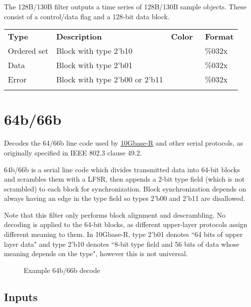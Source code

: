 The 128B/130B filter outputs a time series of 128B/130B sample objects. These consist of a control/data flag and
a 128-bit data block.

\begin{tabularx}{16cm}{lllX}
\thickhline
\textbf{Type} & \textbf{Description} & \textbf{Color} & \textbf{Format} \\
\thickhline
Ordered set & Block with type 2'b10 & \cellcolor{control}\textcolor{white}{Control} & \%032x \\
\thinhline
Data & Block with type 2'b01 & \cellcolor{data}\textcolor{white}{Data} & \%032x \\
\thinhline
Error & Block with type 2'b00 or 2'b11 & \cellcolor{error}\textcolor{white}{Error} & \%032x \\
\thickhline
\end{tabularx}

\pagebreak
\section{64b/66b}
\label{filter:64b66b}

Decodes the 64/66b line code used by \hyperref[filter:10gbaser]{10Gbase-R} and other serial protocols, as originally
specified in IEEE 802.3 clause 49.2.

64b/66b is a serial line code which divides transmitted data into 64-bit blocks and scrambles them with a LFSR, then
appends a 2-bit type field (which is not scrambled) to each block for synchronization. Block synchronization depends on
always having an edge in the type field so types 2'b00 and 2'b11 are disallowed.

Note that this filter only performs block alignment and descrambling. No decoding is applied to the 64-bit blocks, as
different upper-layer protocols assign different meaning to them. In 10Gbase-R, type 2'b01 denotes ``64 bits of upper
layer data" and type 2'b10 denotes ``8-bit type field and 56 bits of data whose meaning depends on the type", however
this is not universal.

\begin{figure}[h]
\centering
{}
\caption{Example 64b/66b decode}
\label{filter_64b66b}
\end{figure}

\subsection{Inputs}

